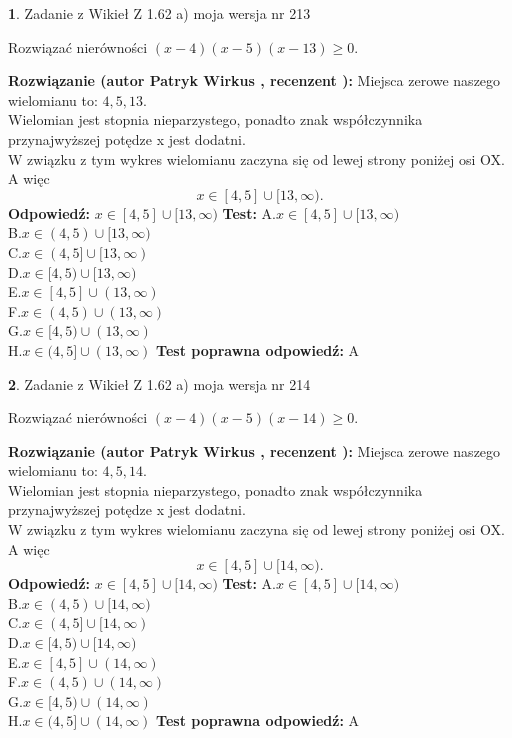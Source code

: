 \documentclass[12pt, a4paper]{article}
\theoremstyle{definition} %
\newtheorem{zad}{}
\newcommand{\zadStart}[1]{\begin{zad}#1\newline}
\newcommand{\zadStop}{\end{zad}}
\newcommand{\rozwStart}[2]{\noindent \textbf{Rozwiązanie (autor #1 , recenzent #2): }\newline}
\newcommand{\rozwStop}{\newline}
\newcommand{\odpStart}{\noindent \textbf{Odpowiedź:}\newline}
\newcommand{\odpStop}{\newline}
\newcommand{\testStart}{\noindent \textbf{Test:}\newline}
\newcommand{\testStop}{\newline}
\newcommand{\kluczStart}{\noindent \textbf{Test poprawna odpowiedź:}\newline}
\newcommand{\kluczStop}{\newline}
\begin{document}
\zadStart{Zadanie z Wikieł Z 1.62 a) moja wersja nr 213}

Rozwiązać nierówności $(x-4)(x-5)(x-13)\ge0$.
\zadStop
\rozwStart{Patryk Wirkus}{}
Miejsca zerowe naszego wielomianu to: $4, 5, 13$.\\
Wielomian jest stopnia nieparzystego, ponadto znak współczynnika przy\linebreak najwyższej potędze x jest dodatni.\\ W związku z tym wykres wielomianu zaczyna się od lewej strony poniżej osi OX. A więc $$x \in [4,5] \cup [13,\infty).$$
\rozwStop
\odpStart
$x \in [4,5] \cup [13,\infty)$
\odpStop
\testStart
A.$x \in [4,5] \cup [13,\infty)$\\
B.$x \in (4,5) \cup [13,\infty)$\\
C.$x \in (4,5] \cup [13,\infty)$\\
D.$x \in [4,5) \cup [13,\infty)$\\
E.$x \in [4,5] \cup (13,\infty)$\\
F.$x \in (4,5) \cup (13,\infty)$\\
G.$x \in [4,5) \cup (13,\infty)$\\
H.$x \in (4,5] \cup (13,\infty)$
\testStop
\kluczStart
A
\kluczStop



\zadStart{Zadanie z Wikieł Z 1.62 a) moja wersja nr 214}

Rozwiązać nierówności $(x-4)(x-5)(x-14)\ge0$.
\zadStop
\rozwStart{Patryk Wirkus}{}
Miejsca zerowe naszego wielomianu to: $4, 5, 14$.\\
Wielomian jest stopnia nieparzystego, ponadto znak współczynnika przy\linebreak najwyższej potędze x jest dodatni.\\ W związku z tym wykres wielomianu zaczyna się od lewej strony poniżej osi OX. A więc $$x \in [4,5] \cup [14,\infty).$$
\rozwStop
\odpStart
$x \in [4,5] \cup [14,\infty)$
\odpStop
\testStart
A.$x \in [4,5] \cup [14,\infty)$\\
B.$x \in (4,5) \cup [14,\infty)$\\
C.$x \in (4,5] \cup [14,\infty)$\\
D.$x \in [4,5) \cup [14,\infty)$\\
E.$x \in [4,5] \cup (14,\infty)$\\
F.$x \in (4,5) \cup (14,\infty)$\\
G.$x \in [4,5) \cup (14,\infty)$\\
H.$x \in (4,5] \cup (14,\infty)$
\testStop
\kluczStart
A
\kluczStop
\end{document}
